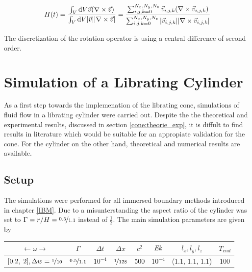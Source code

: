 \begin{align}
H(t) = \frac{\int_V \mathop{}\!\mathrm{d} V \vec{v} (\nabla \times \vec{v})}{\int_V \mathop{}\!\mathrm{d} V |\vec{v}||\nabla \times \vec{v}|}
 = \frac{\sum_{i,j,k=0}^{N_x, N_y, N_z} \vec{v}_{i,j,k} (\nabla \times \vec{v}_{i, j, k})}
 {\sum_{i,j,k=0}^{N_x, N_y, N_z}|\vec{v}_{i,j,k}|| \nabla \times \vec{v}_{i, j, k}|}
\end{align}

The discretization of the rotation operator is using a central difference of second order.



\section{Simulation of a Librating Cylinder}
\label{cone:sec:lib_cylinder}

As a first step towards the implemenation of the librating cone,
simulations of fluid flow in a librating cylinder were carried out.
Despite the the theoretical and experimental results, discussed in section \ref{cone:theorie_exp},
it is diffult to find results in literature which would be suitable for an appropiate validation for the cone.
For the cylinder on the other hand, theoretical and numerical results are available.\\

\subsection{Setup}

The simulations were performed for all immersed boundary methods introduced in chapter \ref{IBM}.
Due to a misunterstanding the aspect ratio of the cylinder was set to $\Gamma=r/H=\nicefrac{0.5}{1.1}$ instead of $\frac{1}{2}$.
The main simulation parameters are given by

\begin{center}
\vspace*{0.7ex}
\begin{tabular}{c|c|c|c|c|c|c|c }
 $\leftarrow  \omega \rightarrow $ & $\Gamma$ & $\Delta t$ & $\Delta x$ & $c^2$ & $\mbox{\textit{Ek}}$  & $l_x, l_y, l_z$ & $T_{end}$\\
\hline
 $[0.2,\; 2], \Delta w = \nicefrac{1}{10}$ & $\nicefrac{0.5}{1.1}$ & $10^{-4}$ & $\nicefrac{1}{128}$ & 500 & $10^{-4}$  & (1.1, 1.1, 1.1) & 100\\
\end{tabular}
\vspace*{0.7ex}
\end{center}
\newpage

